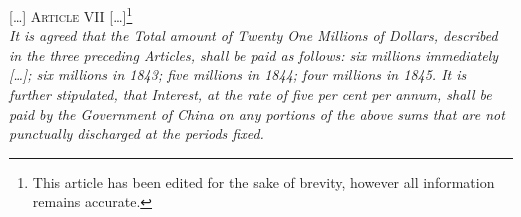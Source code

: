 \documentclass{article}
\newcommand{\textrule}{\noindent\makebox[\linewidth]{\rule{\linewidth}{0.4pt}}}
\begin{document}
{\centering \textsc{[\ldots] Article VII [\ldots]}\footnote{This article has been edited for the sake of brevity, however all information remains accurate.} \\[1em]}
\textit{It is agreed that the Total amount of Twenty One Millions of Dollars, described in the three preceding Articles, shall be paid as follows: six millions immediately \emph{[\ldots]}; six millions in 1843; five millions in 1844; four millions in 1845. It is further stipulated, that Interest, at the rate of five per cent per annum, shall be paid by the Government of China on any portions of the above sums that are not punctually discharged at the periods fixed.} \\[0.6em]
\textrule


\pagebreak
\printbibliography[title={Cited Works}, heading=bibintoc]
\end{document}
